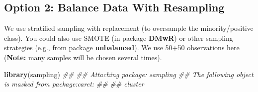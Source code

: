 \documentclass[
  notitlepage]{book}
\newenvironment{Shaded}{\begin{snugshade}}{\end{snugshade}}
\newcommand{\CommentTok}[1]{\textcolor[rgb]{0.56,0.35,0.01}{\textit{#1}}}
\newcommand{\DataTypeTok}[1]{\textcolor[rgb]{0.13,0.29,0.53}{#1}}
\newcommand{\DecValTok}[1]{\textcolor[rgb]{0.00,0.00,0.81}{#1}}
\newcommand{\ErrorTok}[1]{\textcolor[rgb]{0.64,0.00,0.00}{\textbf{#1}}}
\newcommand{\KeywordTok}[1]{\textcolor[rgb]{0.13,0.29,0.53}{\textbf{#1}}}
\newcommand{\NormalTok}[1]{#1}
\newcommand{\OperatorTok}[1]{\textcolor[rgb]{0.81,0.36,0.00}{\textbf{#1}}}
\newcommand{\StringTok}[1]{\textcolor[rgb]{0.31,0.60,0.02}{#1}}
\begin{document}
\hypertarget{option-2-balance-data-with-resampling}{%
\subsection{Option 2: Balance Data With Resampling}\label{option-2-balance-data-with-resampling}}

We use stratified sampling with replacement (to oversample the
minority/positive class). You could also use SMOTE (in package \textbf{DMwR})
or other sampling strategies (e.g., from package \textbf{unbalanced}). We use
50+50 observations here (\textbf{Note:} many samples will be chosen several
times).

\begin{Shaded}
\begin{Highlighting}[]
\KeywordTok{library}\NormalTok{(sampling)}
\CommentTok{\#\# }
\CommentTok{\#\# Attaching package: \textquotesingle{}sampling\textquotesingle{}}
\CommentTok{\#\# The following object is masked from \textquotesingle{}package:caret\textquotesingle{}:}
\CommentTok{\#\# }
\CommentTok{\#\#     cluster}
\end{Highlighting}
\end{Shaded}

\begin{Shaded}
\end{Shaded}
\end{document}
